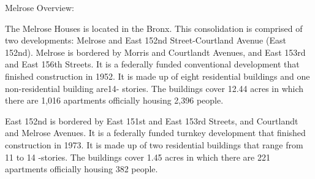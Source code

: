 Melrose Overview: 

The Melrose Houses is located in the Bronx. This consolidation is comprised of two developments: Melrose and East 152nd Street-Courtland Avenue (East 152nd). Melrose is bordered by Morris and Courtlandt Avenues, and East 153rd and East 156th Streets. It is a federally funded conventional development that finished construction in 1952. It is made up of eight residential buildings and one non-residential building are14- stories. The buildings cover 12.44 acres in which there are 1,016 apartments officially housing 2,396 people. 

East 152nd is bordered by East 151st and East 153rd Streets, and Courtlandt and Melrose Avenues. It is a federally funded turnkey development that finished construction in 1973. It is made up of two residential buildings that range from 11 to 14 -stories. The buildings cover 1.45 acres in which there are 221 apartments officially housing 382 people. 